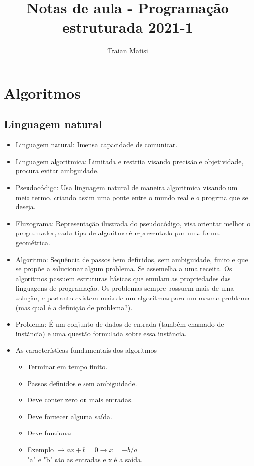 \documentclass[12pt,a4paper]{article} %
\title{Notas de aula - Programação estruturada 2021-1}
\author{Traian Matisi}
\begin{document}
\maketitle

\section{Algoritmos}

\subsection{Linguagem natural}
\begin{itemize}
\item Linguagem natural:
Imensa capacidade de comunicar.
\item Linguagem algoritmica:
Limitada e restrita visando precisão e objetividade, procura evitar ambguidade.
\item Pseudocódigo:
Usa linguagem natural de maneira algoritmica visando um meio termo, criando assim uma ponte entre o mundo real e o progrma que se deseja.
\item Fluxograma:
Representação ilustrada do pseudocódigo, visa orientar melhor o programador, cada tipo de algoritmo é representado por uma forma geométrica.
\item Algoritmo:
Sequência de passos bem definidos, sem ambiguidade, finito e que se propõe a solucionar algum problema. Se assemelha a uma receita. Os algoritmos possuem estruturas básicas que emulam as propriedades das linguagens de programação. Os problemas sempre possuem mais de uma solução, e portanto existem mais de um algoritmos para um mesmo problema (mas qual é a definição de problema?).
\item Problema:
É um conjunto de dados de entrada (também chamado de instância) e uma questão formulada sobre essa instância.
\item As características fundamentais dos algoritmos
\begin{itemize}
\item Terminar em tempo finito.
\item Passos definidos e sem ambiguidade.
\item Deve conter zero ou mais entradas.
\item Deve fornecer alguma saída.
\item Deve funcionar
\item Exemplo $\rightarrow ax+b=0 \rightarrow x=-b/a$\\	"a" e "b" são as entradas e x é a saída.

\end{itemize}
\end{itemize}
\end{document}
